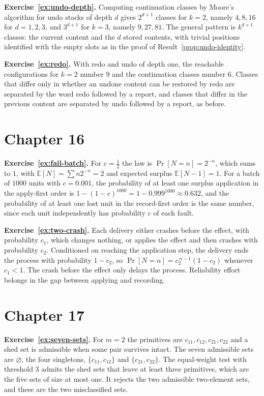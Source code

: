 \textbf{Exercise~\ref{ex:undo-depth}.} Computing continuation classes by Moore's algorithm for undo stacks of depth $d$ gives $2^{d+1}$ classes for $k=2$, namely $4,8,16$ for $d=1,2,3$, and $3^{d+1}$ for $k=3$, namely $9,27,81$. The general pattern is $k^{d+1}$ classes: the current content and the $d$ stored contents, with trivial positions identified with the empty slots as in the proof of Result~\ref{prop:undo-identity}.

\textbf{Exercise~\ref{ex:redo}.} With redo and undo of depth one, the reachable configurations for $k=2$ number $9$ and the continuation classes number $6$. Classes that differ only in whether an undone content can be restored by redo are separated by the word $\mathrm{redo}$ followed by a report, and classes that differ in the previous content are separated by $\mathrm{undo}$ followed by a report, as before.

\section*{Chapter 16}

\textbf{Exercise~\ref{ex:fail-batch}.} For $c=\tfrac12$ the law is $\Pr[N=n]=2^{-n}$, which sums to $1$, with $\mathbb E[N]=\sum n2^{-n}=2$ and expected surplus $\mathbb E[N-1]=1$. For a batch of $1000$ units with $c=0.001$, the probability of at least one surplus application in the apply-first order is $1-(1-c)^{1000}=1-0.999^{1000}\approx0.632$, and the probability of at least one lost unit in the record-first order is the same number, since each unit independently has probability $c$ of each fault.

\textbf{Exercise~\ref{ex:two-crash}.} Each delivery either crashes before the effect, with probability $c_1$, which changes nothing, or applies the effect and then crashes with probability $c_2$. Conditioned on reaching the application step, the delivery ends the process with probability $1-c_2$, so $\Pr[N=n]=c_2^{\,n-1}(1-c_2)$ whenever $c_1<1$. The crash before the effect only delays the process. Reliability effort belongs in the gap between applying and recording.

\section*{Chapter 17}

\textbf{Exercise~\ref{ex:seven-sets}.} For $m=2$ the primitives are $c_{11},c_{12},c_{21},c_{22}$ and a shed set is admissible when some pair survives intact. The seven admissible sets are $\varnothing$, the four singletons, $\{c_{11},c_{12}\}$ and $\{c_{21},c_{22}\}$. The equal-weight test with threshold $3$ admits the shed sets that leave at least three primitives, which are the five sets of size at most one. It rejects the two admissible two-element sets, and these are the two misclassified sets.

